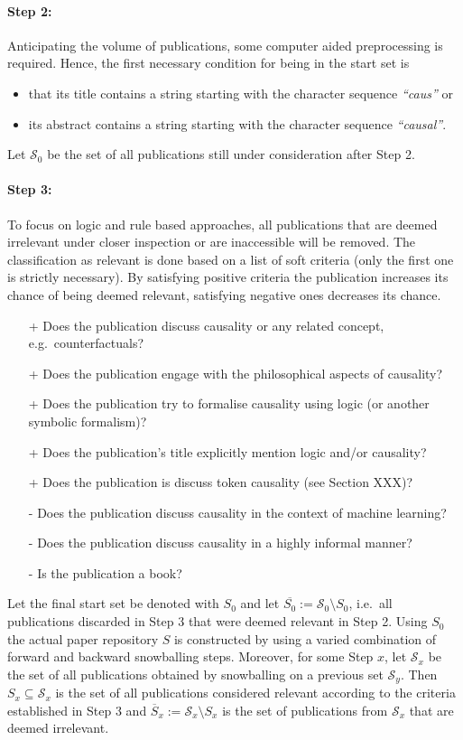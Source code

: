 \documentclass[11pt,a4paper]{book}
\theoremstyle{definition}
\theoremstyle{definition}
\theoremstyle{definition}
\theoremstyle{remark}
\newcommand{\tpset}{\mathcal{S}}
\newcommand{\tpsetz}{\mathcal{S}_{\mathit{0}}}
\newcommand{\pset}{S}
\newcommand{\psetz}{S_{\mathit{0}}}
\newcommand{\npset}{\overline{\pset}}
\newcommand{\npsetz}{\overline{\psetz}}
\begin{document}
\paragraph{Step 2:}  Anticipating the volume of publications, some computer aided preprocessing is required. Hence, the first necessary condition for being in the start set is 
\begin{itemize}
\item  that its title contains a string starting with the character sequence \emph{``caus''} or 
\item  its abstract contains a string starting with the character sequence \emph{``causal''}. 
\end{itemize}
Let $\tpsetz$ be the set of all publications still under consideration after Step 2.
\medskip


\paragraph{Step 3:}  To focus on logic and rule based approaches, all publications that are deemed irrelevant under closer inspection or are inaccessible
will be removed. The classification as relevant is done based on a list of soft criteria (only the first one is strictly necessary). By satisfying positive criteria the publication increases its chance of being deemed relevant, satisfying negative ones decreases its chance.
\begin{itemize}
\item[+] Does the publication discuss causality or any related concept, e.g.\ counterfactuals? 
\item[+] Does the publication engage with the philosophical aspects of causality?
\item[+] Does the publication try to formalise causality using logic (or another symbolic formalism)?
\item[+] Does the publication's title explicitly mention logic and/or causality?
\item[+] Does the publication is discuss token causality (see Section XXX)?
\item[-] Does the publication discuss causality in the context of machine learning?
\item[-] Does the publication discuss causality in a highly informal manner?
\item[-] Is the publication a book?
\end{itemize}
Let the final start set be denoted with $\psetz$ and let $\npsetz:=\tpsetz \setminus \psetz $, i.e.\ all publications discarded in Step 3 that were deemed relevant in Step 2. 
Using $\psetz$ the actual paper repository $\pset$ is constructed by using a varied combination of forward and backward snowballing steps.
Moreover, for some Step $x$,
let $\tpset_x$ be the set of all publications obtained by snowballing on a previous set $\tpset_y$. Then $\pset_x \subseteq \tpset_x$ is the set of all publications considered relevant according to the criteria established in Step 3 and $\npset_x := \tpset_x \setminus \pset_x$ is the set of publications from $\tpset_x$ that are deemed irrelevant. 
\end{document}
